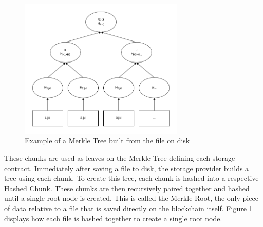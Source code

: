 \documentclass[a4paper]{article}
\begin{document}
\begin{figure}[!htbp]
\centering
\includegraphics[width=0.7\textwidth]{assets/tree2.png}
\caption{Example of a Merkle Tree built from the file on disk}
\label{fig:tree2}
\end{figure}

These chunks are used as leaves on the Merkle Tree defining each storage contract. Immediately after saving a file to disk, the storage provider builds a tree using each chunk. To create this tree, each chunk is hashed into a respective Hashed Chunk. These chunks are then recursively paired together and hashed until a single root node is created. This is called the Merkle Root, the only piece of data relative to a file that is saved directly on the blockchain itself. Figure \ref{fig:tree2} displays how each file is hashed together to create a single root node.

\newpage
\end{document}
